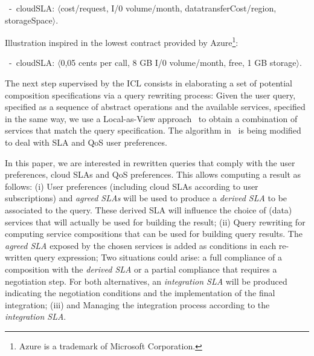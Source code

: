 \begin{trivlist}\sf\footnotesize
 \item[~-~cloudSLA:]  $\langle$cost/request, I/0 volume/month, datatransferCost/region, storageSpace$\rangle$.
 \end{trivlist}
 
Illustration inspired in the lowest contract provided by Azure\footnote{Azure is a trademark of Microsoft Corporation.}: 
 \begin{trivlist}\sf\footnotesize
\item[~-~cloudSLA:]  $\langle$0,05 cents per call, 8 GB I/0 volume/month, free, 1 GB storage$\rangle$. 
\end{trivlist}


 

   

\color{green}


The next step supervised by the ICL consists in elaborating a set of potential composition specifications via a query rewriting process:
Given the user query, specified as a sequence of abstract operations and the available services, specified in the same way, we use a Local-as-View approach~\cite{CostaAMR13} to obtain a combination of services that match the query specification.
The algorithm in~\cite{CostaAMR13} is being modified to deal with SLA and QoS user preferences.

\color{black}

In this paper, we are interested in rewritten queries that comply with the user preferences,  cloud SLAs and QoS preferences.
 This allows computing a result as follows: (i) User preferences (including cloud SLAs according to user subscriptions) and \textit{agreed SLAs} will be used to produce a \textit{derived SLA} to be associated to the query. These derived SLA will influence the choice of (data) services that will actually be used for building the result; (ii) Query rewriting for computing service compositions that can be used for  building query results. The \textit{agreed SLA} exposed by the chosen services is added as  conditions in  each re-written query expression; Two situations could arise: a full compliance of a composition with the \textit{derived SLA} or a partial compliance that requires a negotiation step. For both alternatives, an \textit{integration SLA} will be produced indicating the negotiation conditions and the implementation of the final integration; (iii) and Managing the integration process according to the \textit{integration SLA}.

